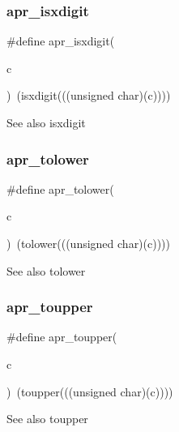 \subsubsection{\texorpdfstring{apr\+\_\+isxdigit}{apr\_isxdigit}}
{\footnotesize\ttfamily \#define apr\+\_\+isxdigit(\begin{DoxyParamCaption}\item[{}]{c }\end{DoxyParamCaption})~(isxdigit(((unsigned char)(c))))}

\begin{DoxySeeAlso}{See also}
isxdigit 
\end{DoxySeeAlso}
\mbox{\label{group__apr__ctype_gaa591f2a7eb578b1fb3ae9aeaab9eafaa}} 
\subsubsection{\texorpdfstring{apr\+\_\+tolower}{apr\_tolower}}
{\footnotesize\ttfamily \#define apr\+\_\+tolower(\begin{DoxyParamCaption}\item[{}]{c }\end{DoxyParamCaption})~(tolower(((unsigned char)(c))))}

\begin{DoxySeeAlso}{See also}
tolower 
\end{DoxySeeAlso}
\mbox{\label{group__apr__ctype_ga83d2a3217282784d24897658ad0717b7}} 
\subsubsection{\texorpdfstring{apr\+\_\+toupper}{apr\_toupper}}
{\footnotesize\ttfamily \#define apr\+\_\+toupper(\begin{DoxyParamCaption}\item[{}]{c }\end{DoxyParamCaption})~(toupper(((unsigned char)(c))))}

\begin{DoxySeeAlso}{See also}
toupper 
\end{DoxySeeAlso}
